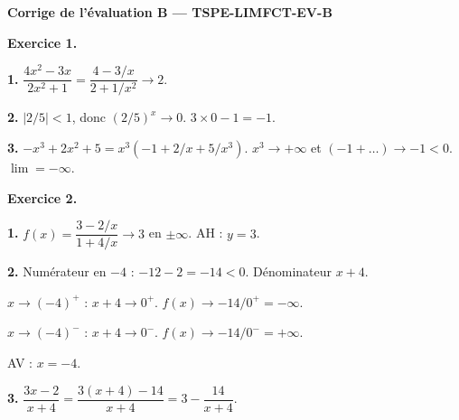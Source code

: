 %
%
%

\textbf{Corrige de l'évaluation B — TSPE-LIMFCT-EV-B}

\bigskip


\textbf{Exercice 1.}

\textbf{1.} $\dfrac{4x^2-3x}{2x^2+1} = \dfrac{4-3/x}{2+1/x^2} \to \boxed{2}$.

\textbf{2.} $|2/5| < 1$, donc $(2/5)^x \to 0$. $3 \times 0 - 1 = \boxed{-1}$.

\textbf{3.} $-x^3 + 2x^2 + 5 = x^3(-1 + 2/x + 5/x^3)$. $x^3 \to +\infty$ et $(-1 + \ldots) \to -1 < 0$. $\boxed{\lim = -\infty}$.

\bigskip


\textbf{Exercice 2.}

\textbf{1.} $f(x) = \dfrac{3-2/x}{1+4/x} \to 3$ en $\pm\infty$. AH : $y = 3$.

\textbf{2.} Numérateur en $-4$ : $-12-2 = -14 < 0$. Dénominateur $x+4$.

$x \to (-4)^+$ : $x+4 \to 0^+$. $f(x) \to -14/0^+ = \boxed{-\infty}$.

$x \to (-4)^-$ : $x+4 \to 0^-$. $f(x) \to -14/0^- = \boxed{+\infty}$.

AV : $x = -4$.

\textbf{3.} $\dfrac{3x-2}{x+4} = \dfrac{3(x+4)-14}{x+4} = 3 - \dfrac{14}{x+4}$.

